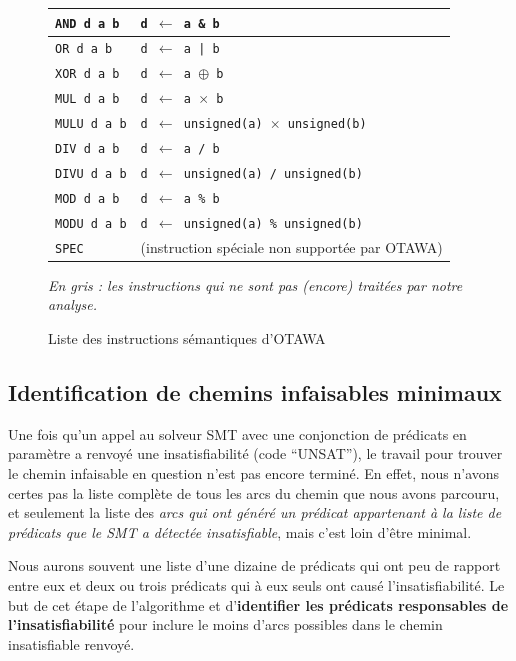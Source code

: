 \documentclass[french]{article}
\begin{document}
\begin{figure}
\begin{tabular}{|l|l|}
      \rowcolor{Gray} \texttt{AND d a b} & \texttt{d $\leftarrow$ a \& b}\\ \hline
      \rowcolor{Gray} \texttt{OR d a b} & \texttt{d $\leftarrow$ a | b}\\ \hline
      \rowcolor{Gray} \texttt{XOR d a b} & \texttt{d $\leftarrow$ a $\oplus$ b}\\ \hline
      \texttt{MUL d a b} & \texttt{d $\leftarrow$ a $\times$ b}\\ \hline
      \rowcolor{Gray} \texttt{MULU d a b} & \texttt{d $\leftarrow$ unsigned(a) $\times$ unsigned(b)}\\ \hline
      \texttt{DIV d a b} & \texttt{d $\leftarrow$ a / b}\\ \hline
      \rowcolor{Gray} \texttt{DIVU d a b} & \texttt{d $\leftarrow$ unsigned(a) / unsigned(b)}\\ \hline
      \texttt{MOD d a b} & \texttt{d $\leftarrow$ a \% b}\\ \hline
      \rowcolor{Gray} \texttt{MODU d a b} & \texttt{d $\leftarrow$ unsigned(a) \% unsigned(b)}\\ \hline
      \rowcolor{Gray} \texttt{SPEC} & (instruction spéciale non supportée par OTAWA)\\ \hline
    \end{tabular}
    \textit{En gris : les instructions qui ne sont pas (encore) traitées par notre analyse.}
    \caption{Liste des instructions sémantiques d'OTAWA}
  \end{figure}

  \subsection{Identification de chemins infaisables minimaux}
  Une fois qu'un appel au solveur SMT avec une conjonction de prédicats en paramètre a renvoyé une insatisfiabilité (code ``UNSAT''), le travail pour trouver le chemin infaisable en question n'est pas encore terminé. En effet, nous n'avons certes pas la liste complète de tous les arcs du chemin que nous avons parcouru, et seulement la liste des \textit{arcs qui ont généré un prédicat appartenant à la liste de prédicats que le SMT a détectée insatisfiable}, mais c'est loin d'être minimal.

  Nous aurons souvent une liste d'une dizaine de prédicats qui ont peu de rapport entre eux et deux ou trois prédicats qui à eux seuls ont causé l'insatisfiabilité. Le but de cet étape de l'algorithme et d'\textbf{identifier les prédicats responsables de l'insatisfiabilité} pour inclure le moins d'arcs possibles dans le chemin insatisfiable renvoyé.
\end{document}

